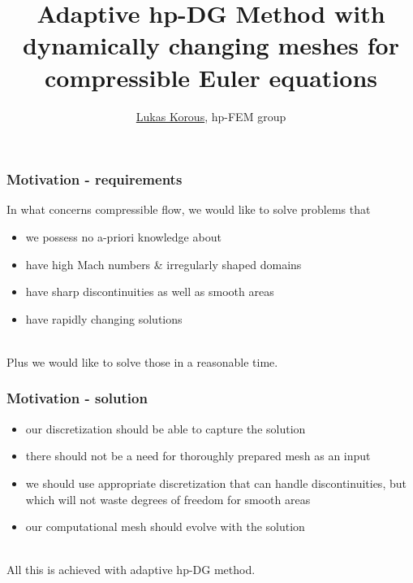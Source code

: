 \documentclass{beamer}
\title{Adaptive hp-DG Method with dynamically changing meshes for compressible Euler equations}
\author{\underline{Lukas Korous}, hp-FEM group}
\institute[Pilsen]{University of West Bohemia, Pilsen}
\begin{document}


\begin{frame}
\large
\titlepage
\end{frame}

\begin{frame}
\large
\frametitle{Motivation - requirements}
In what concerns compressible flow, we would like to solve problems that\\
\begin{itemize}
\item we possess no a-priori knowledge about
\item have high Mach numbers \& irregularly shaped domains
\item have sharp discontinuities as well as smooth areas
\item have rapidly changing solutions
\end{itemize}\ \\
Plus we would like to solve those in a reasonable time.
\end{frame}

\begin{frame}
\large
\frametitle{Motivation - solution}
\begin{itemize}
\item our discretization should be able to capture the solution
\item there should not be a need for thoroughly prepared mesh as an input
\item we should use appropriate discretization that can handle discontinuities, but which will not waste degrees of freedom for smooth areas
\item our computational mesh should evolve with the solution
\end{itemize}\ \\
All this is achieved with adaptive hp-DG method.
\end{frame}
\end{document}
